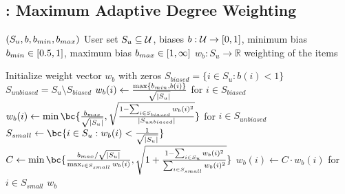 \subsection{\ouralgo{}: Maximum Adaptive Degree Weighting}

\begin{algorithm}[ht]
\caption{\userweights{}$(S_u, b, b_{min}, b_{max})$
 User set $S_u \subseteq \mathcal{U}$,
 biases $b: \mathcal{U} \to [0,1]$,
 minimum bias $b_{min} \in [0.5,1]$, maximum bias $b_{max} \in [1,\infty]$
  $w_b: S_u \to \mathbb{R}$ weighting of the items
}
\begin{algorithmic}[1]
\label{alg:user-biased}
\STATE Initialize weight vector $w_b$ with zeros
\STATE $S_{biased} = \{i \in S_u: b(i) < 1\}$
\STATE $S_{unbiased} = S_u \setminus S_{biased}$
\STATE $w_b(i) \gets \frac{\max\{b_{min}, b(i)\}}{\sqrt{|S_u|}}$ for $i \in S_{biased}$
\STATE $w_b(i) \gets \min\bc{\frac{\bmax}{\sqrt{|S_u|}}, \sqrt{\frac{1-\sum_{i \in S_{biased}} w_b(i)^2}{|S_{unbiased}|}}}$ for $i \in S_{unbiased}$
    \STATE $S_{small} \gets \bc{i \in S_u : w_b(i) < \frac{1}{\sqrt{|S_u|}}}$
    \STATE $C \gets \min\bc{
    \frac{\bmax/\sqrt{|S_u|}}{\max_{i \in S_{small}} w_b(i)},
    \sqrt{1 + \frac{1 - \sum_{i \in S_u} w_b(i)^2}{\sum_{i \in S_{small}} w_b(i)^2}}}$
    \STATE $w_b(i) \gets C \cdot w_b(i)$ for $i \in S_{small}$
\ENDWHILE
\RETURN $w_b$
\end{algorithmic}
\end{algorithm}

